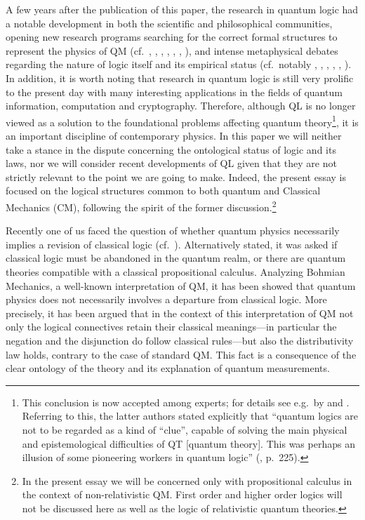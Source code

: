 \documentclass[11pt, executivepaper]{article}
\begin{document}
A few years after the publication of this paper, the research in quantum logic had a notable development in both the scientific and philosophical communities, opening new research programs searching for the correct formal structures to represent the physics of QM (cf.\ \cite{Reichenbach:1944}, \cite{Mackey:1957}, \cite{Finkelstein:1963}, \cite{Kochen:1965}, \cite{Jauch:1969}, \cite{Giuntini:2002}, \cite{DallaChiara:2004}), and intense metaphysical debates regarding the nature of logic itself and its empirical status (cf.\ notably \cite{Quine:1951}, \cite{Putnam:1968}, \cite{Dummett:1976}, \cite{Hallett:1982}, \cite{Weingartner:2004}, \cite{Bacciagaluppi:2009}). In addition, it is worth noting that research in quantum logic is still very prolific to the present day with many interesting applications in the fields of quantum information, computation and cryptography. Therefore, although QL is no longer viewed as a solution to the foundational problems affecting quantum theory\footnote{This conclusion is now accepted among experts; for details see e.g.\ by \cite{Bacciagaluppi:2009} and \cite{Giuntini:2002}. Referring to this, the latter authors stated explicitly that ``quantum logics are not to be regarded as a kind of ``clue'', capable of solving the main physical and epistemological difficulties of QT [quantum theory]. This was perhaps an illusion of some pioneering workers in quantum logic'' (\cite{Giuntini:2002}, p.\ 225).}, it is an important discipline of contemporary physics. In this paper we will neither take a stance in the dispute concerning the ontological status of logic and its laws, nor we will consider recent developments of QL given that they are not strictly relevant to the point we are going to make. Indeed, the present essay is focused on the logical structures common to both quantum and Classical Mechanics (CM), following the spirit of the former discussion.\footnote{In the present essay we will be concerned only with propositional calculus in the context of non-relativistic QM. First order and higher order logics will not be discussed here as well as the logic of relativistic quantum theories.} 

Recently one of us faced the question of whether quantum physics necessarily implies a revision of classical logic (cf.\ \cite{Oldofredi:2020}). Alternatively stated, it was asked if classical logic must be abandoned in the quantum realm, or there are quantum theories compatible with a classical propositional calculus. Analyzing Bohmian Mechanics, a well-known interpretation of QM, it has been showed that quantum physics does not necessarily involves a departure from classical logic. More precisely, it has been argued that in the context of this interpretation of QM not only the logical connectives retain their classical meanings---in particular the negation and the disjunction do follow classical rules---but also the distributivity law holds, contrary to the case of standard QM. This fact is a consequence of the clear ontology of the theory and its explanation of quantum measurements.
\end{document}
